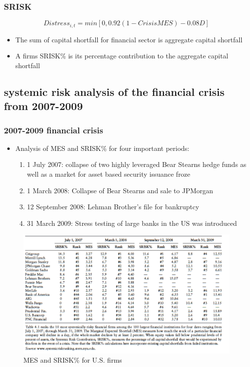 \documentclass[11pt]{beamer}
\begin{document}

\begin{frame}
\frametitle{SRISK}
\begin{equation}
Distress_{i,t} = min[0, 0.92(1-CrisisMES)-0.08D]
\end{equation}
\begin{itemize}
\item The sum of capital shortfall for financial sector is aggregate capital shortfall
\item A firms SRISK\% is its percentage contribution to the aggregate capital shortfall
\end{itemize}
\end{frame}


\subsection*{systemic risk analysis of the financial crisis from 2007-2009}
\begin{frame}
\frametitle{2007-2009 financial crisis}
\begin{itemize}
\item Analysis of MES and SRISK\% for four important periods:
\begin{enumerate}
\item 1 July 2007: collapse of two highly leveraged Bear Stearns hedge funds as well as a market for asset based security issuance froze
\item 1 March 2008: Collapse of Bear Stearns and sale to JPMorgan
\item 12 September 2008: Lehman Brother's file for bankruptcy
\item 31 March 2009: Stress testing of large banks in the US was introduced
\end{enumerate}
\end{itemize}
\end{frame}


\begin{frame}
\begin{figure}
\includegraphics[width=\textwidth]{figuretwo.png}
\caption{MES and SRISK\% for U.S. firms}
\end{figure}
\end{frame}
\end{document}
